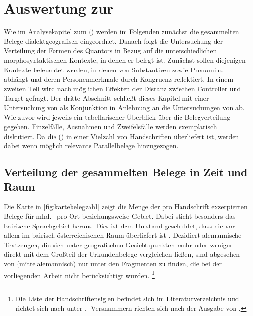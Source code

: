 \chapter{Auswertung zur }
\label{ch:kcanalyse}

Wie im Analysekapitel zum  (\CAO)
werden im Folgenden zunächst die gesammelten Belege dialektgeografisch
eingeordnet. Danach folgt die Untersuchung der Verteilung der Formen des
Quantors  in Bezug auf die unterschiedlichen morphosyntaktischen
Kontexte, in denen er belegt ist. Zunächst sollen diejenigen Kontexte
beleuchtet werden, in denen  von Substantiven sowie Pronomina
abhängt und deren Personenmerkmale durch Kongruenz reflektiert. In einem
zweiten Teil wird nach möglichen Effekten der Distanz zwischen Controller und
Target gefragt. Der dritte Abschnitt schließt dieses Kapitel mit einer
Untersuchung von  als Konjunktion in Anlehnung an die
Untersuchungen von \citet{askedal1974,gjelsten1980} ab. Wie zuvor wird jeweils
ein tabellarischer Überblick über die Belegverteilung gegeben. Einzelfälle,
Ausnahmen und Zweifelsfälle werden exemplarisch diskutiert. Da die
 (\KC{}) in einer Vielzahl von Handschriften überliefert
ist, werden dabei wenn möglich relevante Parallelbelege hinzugezogen.

\section{Verteilung der gesammelten Belege in Zeit und Raum}
\label{subsec:beiddispmap}

Die Karte in \cref{fig:kartebelegzahl} zeigt die Menge der pro Handschrift
exzerpierten Belege für mhd.\  pro Ort beziehungsweise Gebiet. Dabei
sticht besonders das bairische Sprachgebiet heraus. Dies ist dem Umstand
geschuldet, dass die \KC{} vor allem im bairisch-österreichischen Raum
überliefert ist \autocite{klein1988}. Dezidiert alemannische Textzeugen, die
sich unter geografischen Gesichtspunkten mehr oder weniger direkt mit dem
Großteil der Urkundenbelege vergleichen ließen, sind abgesehen von \citet{kc:K}
(mittelalemannisch) nur unter den Fragmenten zu finden, die bei der
vorliegenden Arbeit nicht berücksichtigt wurden.%
%
	\footnote{Die Liste der Handschriftensiglen befindet sich im
		Literaturverzeichnis und richtet sich nach  unter
		. \KC{}-Versnummern richten sich nach der
		Ausgabe von \nosh\citet{schroeder1895}.%
	}

